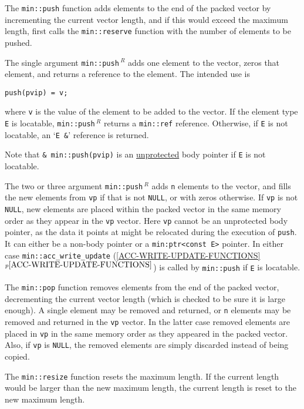 \documentclass[12pt]{article}
\newcommand{\itemref}[1]{\ref{#1}$^{p\pageref{#1}}$}
\newcommand{\EOL}{\penalty \exhyphenpenalty}
\newenvironment{indpar}[1][0.3in]%
	{\begin{list}{}%
		     {\setlength{\itemsep}{0in}%
		      \setlength{\topsep}{0in}%
		      \setlength{\parsep}{1ex}%
		      \setlength{\labelwidth}{#1}%
		      \setlength{\leftmargin}{#1}%
		      \addtolength{\leftmargin}{\labelsep}}%
	 \item}%
	{\end{list}}
\newcommand{\REL}{$\,^R$}
\begin{document}
The \verb|min::push| function adds elements
to the end of the packed vector
by incrementing the current vector length, and if this would
exceed the maximum length, first calls the \verb|min::reserve| function
with the number of elements to be pushed.

The single argument {\tt min::\EOL push\REL} adds one element to the vector,
zeros that element, and returns a reference to the element.  The
intended use is
\begin{indpar}\begin{verbatim}
push(pvip) = v;
\end{verbatim}\end{indpar}
where \verb|v| is the value of the element to be added to the vector.
If the element type {\tt E} is locatable, {\tt min::\EOL push\REL}
returns a {\tt min::\EOL ref\TARG}
reference.  Otherwise, if {\tt E} is not locatable, an
`{\tt E \&}' reference is returned.

Note that {\tt \& min::push(pvip)}
is an \underline{unprotected} body pointer if {\tt E} is not
locatable.

The two or three argument {\tt min::\EOL push\REL} adds {\tt n}
elements to the vector, and fills the new elements from {\tt vp}
if that is not {\tt NULL}, or with zeros otherwise.
If \verb|vp| is not \verb|NULL|,
new elements are placed within the packed vector in the same
memory order as they appear in the \verb|vp| vector.
Here \verb|vp| cannot be an unprotected body pointer, as the data
it points at might be relocated during the execution of {\tt push}.
It can either be a non-body pointer or a {\tt min:\EOL ptr<const E>} pointer.
In either case {\tt min::\EOL acc\_\EOL write\_\EOL update} 
(\itemref{ACC-WRITE-UPDATE-FUNCTIONS})
is called by {\tt min::\EOL push} if {\tt E} is locatable.

The \verb|min::pop| function removes elements from the end of the
packed vector, decrementing the current vector length (which is checked
to be sure it is large enough).   A single element may be removed and
returned, or \verb|n| elements may be removed and returned in the
\verb|vp| vector.  In the latter case removed elements are placed in
\verb|vp| in the same memory order as they appeared in the packed vector.
Also,
if \verb|vp| is \verb|NULL|, the removed elements are simply discarded
instead of being copied.

The \verb|min::resize| function resets the maximum length.  If
the current length would be larger than the new maximum length,
the current length is reset to the new maximum length.
\end{document}
